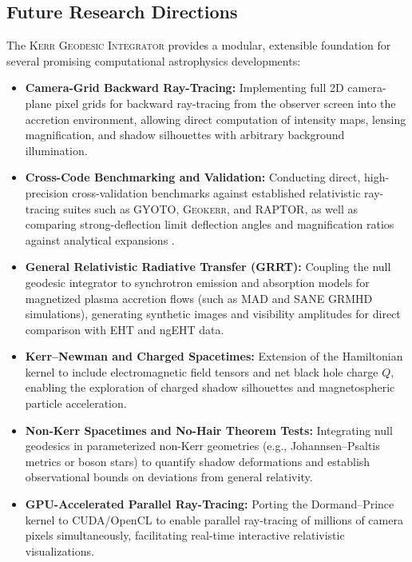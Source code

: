 \subsection{Future Research Directions}
The \textsc{Kerr Geodesic Integrator} provides a modular, extensible foundation for several promising computational astrophysics developments:
\begin{itemize}
    \item \textbf{Camera-Grid Backward Ray-Tracing:} Implementing full 2D camera-plane pixel grids for backward ray-tracing from the observer screen into the accretion environment, allowing direct computation of intensity maps, lensing magnification, and shadow silhouettes with arbitrary background illumination.
    \item \textbf{Cross-Code Benchmarking and Validation:} Conducting direct, high-precision cross-validation benchmarks against established relativistic ray-tracing suites such as \textsc{GYOTO}, \textsc{Geokerr}, and \textsc{RAPTOR}, as well as comparing strong-deflection limit deflection angles and magnification ratios against analytical expansions \cite{Bozza2002}.
    \item \textbf{General Relativistic Radiative Transfer (GRRT):} Coupling the null geodesic integrator to synchrotron emission and absorption models for magnetized plasma accretion flows (such as MAD and SANE GRMHD simulations), generating synthetic images and visibility amplitudes for direct comparison with EHT and ngEHT data.
    \item \textbf{Kerr--Newman and Charged Spacetimes:} Extension of the Hamiltonian kernel to include electromagnetic field tensors and net black hole charge $Q$, enabling the exploration of charged shadow silhouettes and magnetospheric particle acceleration.
    \item \textbf{Non-Kerr Spacetimes and No-Hair Theorem Tests:} Integrating null geodesics in parameterized non-Kerr geometries (e.g., Johannsen--Psaltis metrics \cite{JohannsenPsaltis2010} or boson stars) to quantify shadow deformations and establish observational bounds on deviations from general relativity.
    \item \textbf{GPU-Accelerated Parallel Ray-Tracing:} Porting the Dormand--Prince kernel to CUDA/OpenCL to enable parallel ray-tracing of millions of camera pixels simultaneously, facilitating real-time interactive relativistic visualizations.
\end{itemize}
